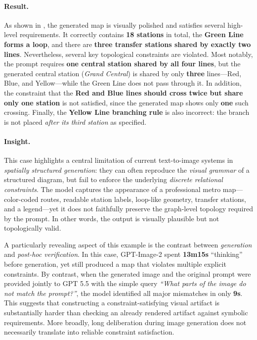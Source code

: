 \documentclass{llmxive}
\begin{document}
\paragraph{Result.}
As shown in , the generated map is visually polished and satisfies several high-level requirements. It correctly contains \textbf{18 stations} in total, the \textbf{Green Line forms a loop}, and there are \textbf{three transfer stations shared by exactly two lines}. Nevertheless, several key topological constraints are violated. Most notably, the prompt requires \textbf{one central station shared by all four lines}, but the generated central station (\textit{Grand Central}) is shared by only \textbf{three} lines---Red, Blue, and Yellow---while the Green Line does not pass through it. In addition, the constraint that the \textbf{Red and Blue lines should cross twice but share only one station} is not satisfied, since the generated map shows only \textbf{one} such crossing. Finally, the \textbf{Yellow Line branching rule} is also incorrect: the branch is not placed \emph{after its third station} as specified.

\paragraph{Insight.}
This case highlights a central limitation of current text-to-image systems in \emph{spatially structured generation}: they can often reproduce the \emph{visual grammar} of a structured diagram, but fail to enforce the underlying \emph{discrete relational constraints}. The model captures the appearance of a professional metro map---color-coded routes, readable station labels, loop-like geometry, transfer stations, and a legend---yet it does not faithfully preserve the graph-level topology required by the prompt. In other words, the output is visually plausible but not topologically valid.

A particularly revealing aspect of this example is the contrast between \emph{generation} and \emph{post-hoc verification}. In this case, GPT-Image-2 spent \textbf{13m15s} ``thinking'' before generation, yet still produced a map that violates multiple explicit constraints. By contrast, when the generated image and the original prompt were provided jointly to GPT 5.5 with the simple query \textit{``What parts of the image do not match the prompt?''}, the model identified all major mismatches in only \textbf{9s}. This suggests that constructing a constraint-satisfying visual artifact is substantially harder than checking an already rendered artifact against symbolic requirements. More broadly, long deliberation during image generation does not necessarily translate into reliable constraint satisfaction.
\end{document}
